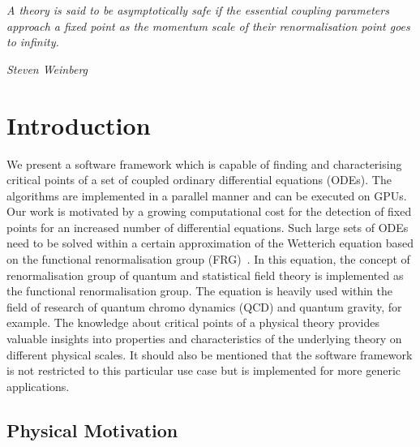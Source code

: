 \documentclass[paper=a4,11pt,bibliography=totoc]{scrartcl}
\title{\vspace*{5cm}\onehalfspacing{Visualising the Functional Renormalisation Group}}
\subtitle{\vspace*{1.4cm}\onehalfspacing Universität Heidelberg\\-- Project report --\\Fortgeschrittenenpraktikum (2018/2019)\\[0.4in]
}
\author{Lukas Kades}
\date{\today}
\begin{document}
\maketitle
\thispagestyle{empty}
\newpage
\setcounter{page}{1}
\renewcommand{\contentsname}{I Contents}
\renewcommand{\refname}{II References}
\tableofcontents

\newpage 


\epigraph{\textit{A theory is said to be asymptotically safe if the essential coupling parameters approach a fixed point as the momentum scale of their renormalisation point goes to infinity.}}{\textit{Steven Weinberg}~\cite{Weinberg1980}}

\section{Introduction}
\label{sec:intro}

We present a software framework which is capable of finding and characterising critical points of a set of coupled ordinary differential equations (ODEs). The algorithms are implemented in a parallel manner and can be executed on GPUs. Our work is motivated by a growing computational cost for the detection of fixed points for an increased number of differential equations. Such large sets of ODEs need to be solved within a certain approximation of the Wetterich equation based on the functional renormalisation group (FRG)~\cite{Pawlowski2018}. In this equation, the concept of renormalisation group of quantum and statistical field theory is implemented as the functional renormalisation group. The equation is heavily used within the field of research of quantum chromo dynamics (QCD) and quantum gravity, for example. The knowledge about critical points of a physical theory provides valuable insights into properties and characteristics of the underlying theory on different physical scales. It should also be mentioned that the software framework is not restricted to this particular use case but is implemented for more generic applications.

\subsection{Physical Motivation}
\end{document}
